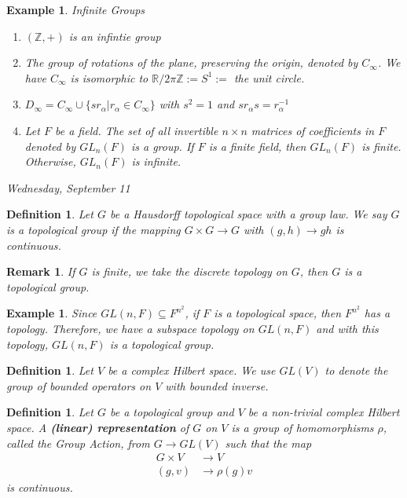 \documentclass[letterpaper, leqno, 12pt]{article}
\newcommand{\fin}{\qquad \quad \hfill \framebox[1.75mm][l]{\,}}
\newcommand{\bR}{\mathbb{R}}
\newcommand{\bZ}{\mathbb{Z}}
\theoremstyle{stdthm}
\theoremstyle{stddef}
\newtheorem{defn}[thm]{Definition}
\newtheorem{rem}[thm]{Remark} %
\newtheorem{eg}[thm]{Example} %
\theoremstyle{stdnonum}
\theoremstyle{stdqands}
\theoremstyle{stdbold}
\begin{document}
\begin{eg} {Infinite Groups}
\begin{enumerate}
\item $(\bZ,+)$ is an infintie group
\item The group of rotations of the plane, preserving the origin, denoted by $C_\infty$. We have $C_\infty$ is isomorphic to $\bR/2\pi \bZ:= S^1:=$ the unit circle.
\item $D_\infty = C_\infty \cup \{ sr_\alpha | r_\alpha \in C_\infty \}$ with $s^2 = 1$ and $sr_\alpha s = r_\alpha^{-1}$
\item Let $F$ be a field. The set of all invertible $n\times n$ matrices of coefficients in $F$ denoted by $GL_n(F)$ is a group. If $F$ is a finite field, then $GL_n(F)$ is finite. Otherwise, $GL_n(F)$ is infinite.  
\end{enumerate}
\end{eg}
\newpage
\begin{center}
\emph{Wednesday, September 11}
\end{center}


\begin{defn}
Let $G$ be a Hausdorff topological space with a group law. We say $G$ is a topological group if the mapping $G\times G \rightarrow G$ with $(g,h) \rightarrow gh$ is continuous.   
\end{defn}

\begin{rem}
If $G$ is finite, we take the discrete topology on $G$, then $G$ is a topological group. 
\end{rem}

\begin{eg}
Since $GL(n,F) \subseteq F^{n^2}$, if $F$ is a topological space, then $F^{n^2}$ has a topology. Therefore, we have a subspace topology on $GL(n,F)$ and with this topology, $GL(n,F)$ is a topological group. 
\end{eg}

\begin{defn} 
Let $V$ be a complex Hilbert space. We use $GL(V)$ to denote the group of bounded operators on $V$ with bounded inverse. 
\end{defn}

\begin{defn}
Let $G$ be a topological group and $V$ be a non-trivial complex Hilbert space. A {\bf (linear) representation } of $G$ on $V$ is a group of homomorphisms $\rho$, called the Group Action, from $G \rightarrow GL(V)$ such that the map 
\begin{align*}
G\times V &\rightarrow V\\
(g,v) &\rightarrow \rho(g) v
\end{align*} 
is continuous. 
\end{defn}
\end{document}
